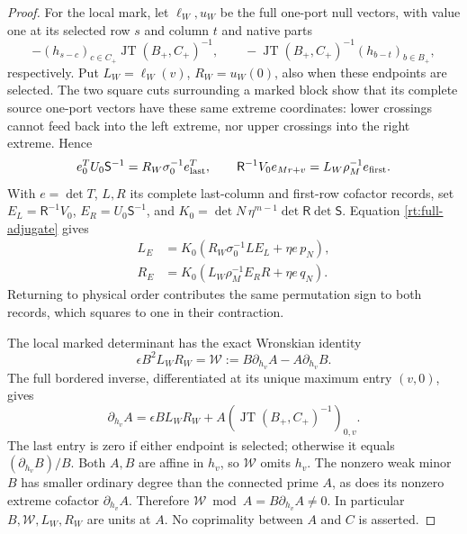 \documentclass[11pt,a4paper]{amsart}
\numberwithin{equation}{section}
\theoremstyle{plain}
\theoremstyle{definition}
\newcommand{\JT}{\operatorname{JT}}
\begin{document}
\begin{proof}
For the local mark, let \(\ell_W,u_W\) be the full one-port null
vectors, with value one at its selected row \(s\) and column \(t\)
and native parts
\[
 -(h_{s-c})_{c\in C_+}\JT(B_+,C_+)^{-1},
 \qquad
 -\JT(B_+,C_+)^{-1}(h_{b-t})_{b\in B_+},
\]
respectively.  Put \(L_W=\ell_W(v)\), \(R_W=u_W(0)\), also when
these endpoints are selected.  The two square cuts surrounding a
marked block show that its complete source one-port vectors have
these same extreme coordinates: lower crossings cannot feed back into
the left extreme, nor upper crossings into the right extreme.
Hence
\[
 e_0^TU_0\mathsf S^{-1}=R_W\sigma_0^{-1}e_{\rm last}^T,\qquad
 \mathsf R^{-1}V_0e_{Mr+v}=L_W\rho_M^{-1}e_{\rm first}.
\]
With \(e=\det T\), \(L,R\) its complete last-column and first-row
cofactor records, set \(E_L=\mathsf R^{-1}V_0\),
\(E_R=U_0\mathsf S^{-1}\), and
\(K_0=\det N\,\eta^{m-1}\det\mathsf R\det\mathsf S\).
Equation \eqref{rt:full-adjugate} gives
\begin{equation}\label{rt:four-records}
 \begin{split}
 L_E&=K_0(R_W\sigma_0^{-1}L E_L+\eta e\,p_N),\\
 R_E&=K_0(L_W\rho_M^{-1}E_R R+\eta e\,q_N).
 \end{split}
\end{equation}
Returning to physical order contributes the same permutation sign
to both records, which squares to one in their contraction.

The local marked determinant has the exact Wronskian identity
\begin{equation}\label{rt:mark-wronskian}
 \epsilon B^2L_WR_W=\mathcal W
 :=B\partial_{h_v}A-A\partial_{h_v}B.
\end{equation}
The full bordered inverse, differentiated at its unique
maximum entry \((v,0)\), gives
\[
 \partial_{h_v}A=\epsilon B L_WR_W+
                   A(\JT(B_+,C_+)^{-1})_{0,v}.
\]
The last entry is zero if either endpoint is selected; otherwise
it equals \((\partial_{h_v}B)/B\).
Both \(A,B\) are affine in \(h_v\), so \(\mathcal W\) omits \(h_v\).
The nonzero weak minor \(B\) has smaller ordinary degree than the
connected prime \(A\), as does its nonzero extreme cofactor
\(\partial_{h_v}A\).  Therefore
\(\mathcal W\bmod A=B\partial_{h_v}A\ne0\).
In particular \(B,\mathcal W,L_W,R_W\) are units at \(A\).
No coprimality between \(A\) and \(C\) is asserted.


\end{proof}
\end{document}
